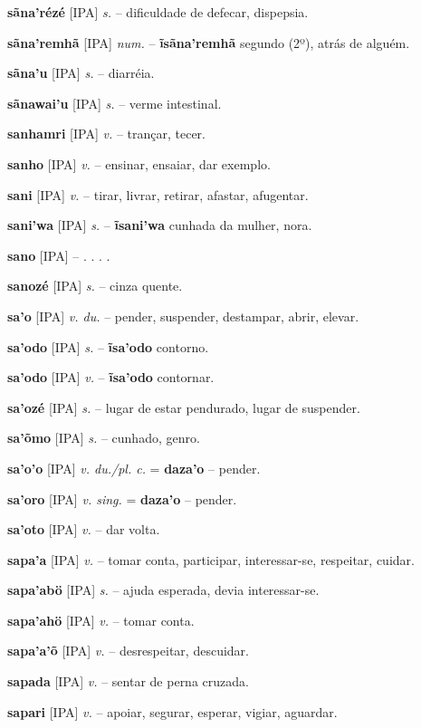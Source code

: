 \textbf{sãna'rézé} [IPA] \textit{s.} -- dificuldade de defecar, dispepsia.

\textbf{sãna'remhã} [IPA] \textit{num.} -- \textbf{ĩsãna'remhã} segundo (2º), atrás de alguém.

\textbf{sãna'u} [IPA] \textit{s.} -- diarréia.

\textbf{sãnawai'u} [IPA] \textit{s.} -- verme intestinal.

\textbf{sanhamri} [IPA] \textit{v.} -- trançar, tecer.

\textbf{sanho} [IPA] \textit{v.} -- ensinar, ensaiar, dar exemplo.

\textbf{sani} [IPA] \textit{v.} -- tirar, livrar, retirar, afastar, afugentar.

\textbf{sani'wa} [IPA] \textit{s.} -- \textbf{ĩsani'wa} cunhada da mulher, nora.

\textbf{sano} [IPA] \textit{} -- . . . .

\textbf{sanozé} [IPA] \textit{s.} -- cinza quente.

\textbf{sa'o} [IPA] \textit{v. du.} -- pender, suspender,  destampar, abrir, elevar.

\textbf{sa'odo} [IPA] \textit{s.} -- \textbf{ĩsa'odo} contorno.

\textbf{sa'odo} [IPA] \textit{v.} -- \textbf{ĩsa'odo} contornar.

\textbf{sa'ozé} [IPA] \textit{s.} -- lugar de estar pendurado, lugar de suspender.

\textbf{sa'õmo} [IPA] \textit{s.} -- cunhado, genro.

\textbf{sa'o'o} [IPA] \textit{v. du./pl. c.} = \textbf{daza'o} -- pender.

\textbf{sa'oro} [IPA] \textit{v. sing.} = \textbf{daza'o} -- pender.

\textbf{sa'oto} [IPA] \textit{v.} -- dar volta.

\textbf{sapa'a} [IPA] \textit{v.} -- tomar conta, participar, interessar-se, respeitar, cuidar.

\textbf{sapa'abö} [IPA] \textit{s.} -- ajuda esperada, devia interessar-se.

\textbf{sapa'ahö} [IPA] \textit{v.} -- tomar conta.

\textbf{sapa'a'õ} [IPA] \textit{v.} -- desrespeitar, descuidar.

\textbf{sapada} [IPA] \textit{v.} -- sentar de perna cruzada.

\textbf{sapari} [IPA] \textit{v.} -- apoiar, segurar, esperar, vigiar, aguardar.

